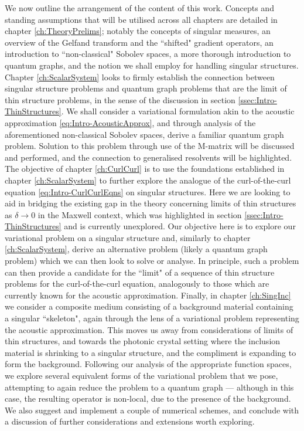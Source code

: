 We now outline the arrangement of the content of this work.
Concepts and standing assumptions that will be utilised across all chapters are detailed in chapter \ref{ch:TheoryPrelims}; notably the concepts of singular measures, an overview of the Gelfand transform and the ``shifted" gradient operators, an introduction to ``non-classical" Sobolev spaces, a more thorough introduction to quantum graphs, and the notion we shall employ for handling singular structures.
Chapter \ref{ch:ScalarSystem} looks to firmly establish the connection between singular structure problems and quantum graph problems that are the limit of thin structure problems, in the sense of the discussion in section \ref{ssec:Intro-ThinStructures}.
We shall consider a variational formulation akin to the acoustic approximation \eqref{eq:Intro-AcousticApprox}, and through analysis of the aforementioned non-classical Sobolev spaces, derive a familiar quantum graph problem.
Solution to this problem through use of the M-matrix will be discussed and performed, and the connection to generalised resolvents will be highlighted.
The objective of chapter \ref{ch:CurlCurl} is to use the foundations established in chapter \ref{ch:ScalarSystem} to further explore the analogue of the curl-of-the-curl equation \eqref{eq:Intro-CurlCurlEqns} on singular structures.
Here we are looking to aid in bridging the existing gap in the theory concerning limits of thin structures as $\delta\rightarrow0$ in the Maxwell context, which was highlighted in section \ref{ssec:Intro-ThinStructures} and is currently unexplored.
Our objective here is to explore our variational problem on a singular structure and, similarly to chapter \ref{ch:ScalarSystem}, derive an alternative problem (likely a quantum graph problem) which we can then look to solve or analyse.
In principle, such a problem can then provide a candidate for the ``limit" of a sequence of thin structure problems for the curl-of-the-curl equation, analogously to those which are currently known for the acoustic approximation.
Finally, in chapter \ref{ch:SingInc} we consider a composite medium consisting of a background material containing a singular ``skeleton", again through the lens of a variational problem representing the acoustic approximation.
This moves us away from considerations of limits of thin structures, and towards the photonic crystal setting where the inclusion material is shrinking to a singular structure, and the compliment is expanding to form the background.
Following our analysis of the appropriate function spaces, we explore several equivalent forms of the variational problem that we pose, attempting to again reduce the problem to a quantum graph --- although in this case, the resulting operator is non-local, due to the presence of the background.
We also suggest and implement a couple of numerical schemes, and conclude with a discussion of further considerations and extensions worth exploring.